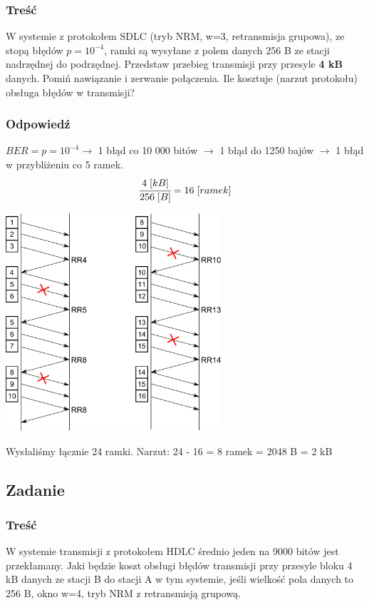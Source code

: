 		\subsubsection{Treść}
			W systemie z protokołem SDLC (tryb NRM, w=3, retransmisja grupowa), ze stopą błędów $ p=10^{-4} $, ramki są wysyłane z polem danych 256 B ze stacji nadrzędnej do podrzędnej. Przedstaw przebieg transmisji przy przesyle \textbf{4 kB} danych. Pomiń nawiązanie i zerwanie połączenia. Ile kosztuje (narzut protokołu) obsługa błędów w transmisji?
		\subsubsection{Odpowiedź}
			$ BER=p=10^{-4} \rightarrow$ 1 błąd co 10 000 bitów $ \rightarrow $ 1 błąd do 1250 bajów $ \rightarrow $ 1 błąd w przybliżeniu co 5 ramek.\\
			$$ \cfrac{4\;[kB]}{256\;[B]}=16\;[ramek] $$
			\begin{center}
				\includegraphics[width=8.0cm]{./images/zadanie10.pdf}
			\end{center}
			Wysłaliśmy łącznie 24 ramki. Narzut: 24 - 16 = 8 ramek = 2048 B = 2 kB
\newpage
	\subsection{Zadanie}
		\subsubsection{Treść}
			W systemie transmisji z protokołem HDLC średnio jeden na 9000 bitów jest przekłamany. Jaki będzie koszt obsługi błędów transmisji przy przesyle bloku 4 kB danych ze stacji B do stacji A w tym systemie, jeśli wielkość pola danych to 256 B, okno w=4, tryb NRM z retransmisją grupową.
